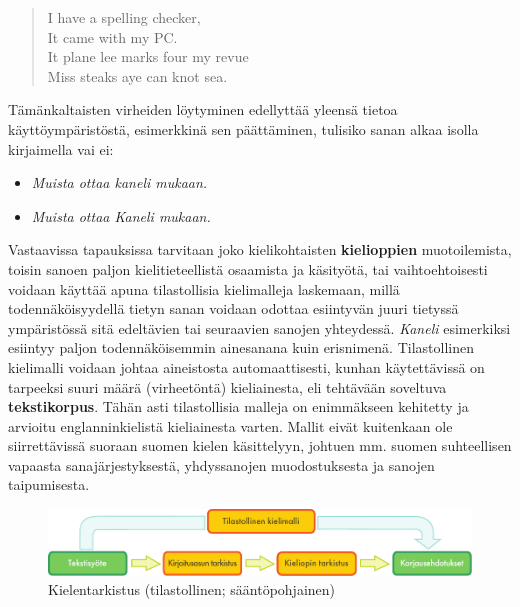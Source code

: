 \begin{multicols}{2}
\begin{quote}
  I have a spelling checker,\\
  It came with my PC.\\
  It plane lee marks four my revue\\
  Miss steaks aye can knot sea.~\cite{Surprise}
\end{quote}

Tämänkaltaisten virheiden löytyminen edellyttää yleensä tietoa
käyttöympäristöstä, esimerkkinä sen päättäminen, tulisiko sanan alkaa
isolla kirjaimella vai ei:
\begin{itemize}
\item[] \textit{Muista ottaa kaneli mukaan.}

\item[] \textit{Muista ottaa Kaneli mukaan.}
\end{itemize}
Vastaavissa tapauksissa tarvitaan joko
kielikohtaisten \textbf{kielioppien} muotoilemista, toisin
sanoen paljon kielitieteellistä osaamista ja
käsityötä, tai vaihtoehtoisesti voidaan käyttää apuna tilastollisia
kielimalleja laskemaan, millä todennäköisyydellä tietyn sanan voidaan odottaa 
esiintyvän juuri tietyssä ympäristössä sitä edeltävien
tai seuraavien sanojen yhteydessä. \textit{Kaneli} esimerkiksi
esiintyy paljon todennäköisemmin ainesanana kuin
erisnimenä. Tilastollinen kielimalli voidaan johtaa aineistosta
automaattisesti, kunhan käytettävissä on tarpeeksi suuri määrä
(virheetöntä) kieliainesta, eli tehtävään soveltuva
\textbf{tekstikorpus}. Tähän asti tilastollisia malleja on enimmäkseen kehitetty
ja arvioitu englanninkielistä kieliainesta varten. Mallit eivät kuitenkaan
ole siirrettävissä suoraan suomen kielen käsittelyyn, johtuen mm.
suomen suhteellisen vapaasta sanajärjestyksestä, yhdyssanojen
muodostuksesta ja sanojen taipumisesta.

\begin{figure}[htb]
  \center
  \includegraphics[width=\textwidth]{../_media/finnish/language_checking}
  \caption{Kielentarkistus (tilastollinen; sääntöpohjainen)}
  \label{fig:langcheckingarch-fin}
\end{figure}


\end{multicols}
